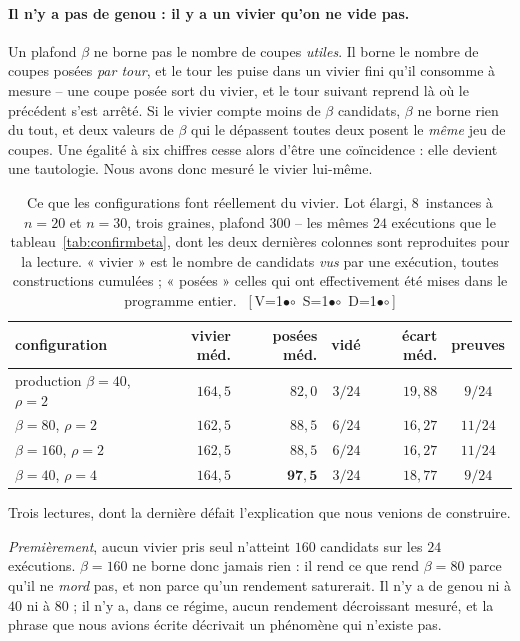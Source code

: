 \documentclass[11pt,a4paper]{article}
\theoremstyle{plain}
\theoremstyle{remark}
\newcommand{\cfgm}[1]{\ifnum#1=1$\bullet$\else$\circ$\fi}
\newcommand{\conf}[3]{%
  \textsf{\footnotesize[\,V\cfgm{#1}\ S\cfgm{#2}\ D\cfgm{#3}\,]}}
\begin{document}
\paragraph{Il n'y a pas de genou : il y a un vivier qu'on ne vide pas.}
Un plafond $\beta$ ne borne pas le nombre de coupes \emph{utiles}. Il borne
le nombre de coupes posées \emph{par tour}, et le tour les puise dans un
vivier fini qu'il consomme à mesure -- une coupe posée sort du vivier, et le
tour suivant reprend là où le précédent s'est arrêté. Si le vivier compte
moins de $\beta$ candidats, $\beta$ ne borne rien du tout, et deux valeurs
de $\beta$ qui le dépassent toutes deux posent le \emph{même} jeu de coupes.
Une égalité à six chiffres cesse alors d'être une coïncidence : elle devient
une tautologie. Nous avons donc mesuré le vivier lui-même.

\begin{table}[H]
\centering
\caption{Ce que les configurations font réellement du vivier. Lot élargi,
$8$~instances à $n=20$ et $n=30$, trois graines, plafond $300$ -- les mêmes
$24$ exécutions que le tableau~\ref{tab:confirmbeta}, dont les deux
dernières colonnes sont reproduites pour la lecture. « vivier » est le
nombre de candidats \emph{vus} par une exécution, toutes constructions
cumulées ; « posées » celles qui ont effectivement été mises dans le
programme entier.\ \conf{1}{1}{1}}
\label{tab:vivier}
\setlength{\tabcolsep}{5pt}\small
\begin{tabular}{lrrrrc}
\toprule
configuration & vivier méd. & posées méd. & vidé & écart méd. & preuves\\
\midrule
production $\beta=40$, $\rho=2$ & $164{,}5$ & $82{,}0$ & $3/24$ & $19{,}88$ & $9/24$\\
$\beta=80$, $\rho=2$ & $162{,}5$ & $88{,}5$ & $6/24$ & $16{,}27$ & $11/24$\\
$\beta=160$, $\rho=2$ & $162{,}5$ & $88{,}5$ & $6/24$ & $16{,}27$ & $11/24$\\
$\beta=40$, $\rho=4$ & $164{,}5$ & $\mathbf{97{,}5}$ & $3/24$ & $18{,}77$ & $9/24$\\
\bottomrule
\end{tabular}
\end{table}

\noindent
Trois lectures, dont la dernière défait l'explication que nous venions de
construire.

\emph{Premièrement}, aucun vivier pris seul n'atteint $160$ candidats sur
les $24$ exécutions. $\beta=160$ ne borne donc jamais rien : il rend ce que
rend $\beta=80$ parce qu'il ne \emph{mord} pas, et non parce qu'un rendement
saturerait. Il n'y a de genou ni à $40$ ni à $80$ ; il n'y a, dans ce
régime, aucun rendement décroissant mesuré, et la phrase que nous avions
écrite décrivait un phénomène qui n'existe pas.
\end{document}
